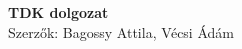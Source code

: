 \begin{titlepage}

\center
\vspace*{7.5cm}
{\huge \bfseries TDK dolgozat}\\[0.5cm]

{\LARGE Szerzők: Bagossy Attila, Vécsi Ádám}

\vfill

\end{titlepage}

